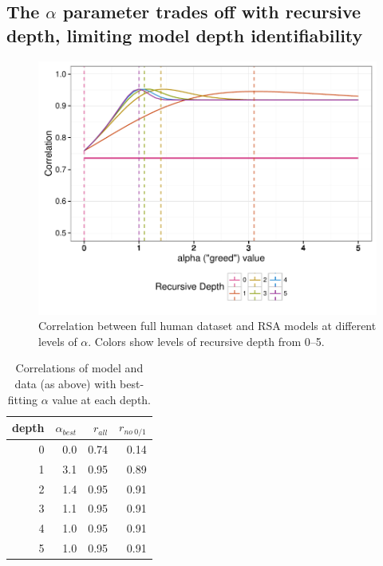 \documentclass[man,noapacite]{apa2}
\begin{document}
\subsection{The $\alpha$ parameter trades off with recursive depth, limiting model depth identifiability}

\begin{figure}[t]
 \centering
 \includegraphics[width=5in]{../plots/alpha-fit.pdf}
 \caption{\label{fig:alpha-fit} Correlation between full human dataset and RSA models at different levels of $\alpha$. Colors show levels of recursive depth from 0--5.}
\end{figure}

\begin{table}[ht]
\centering
\begin{tabular}{rrrr}
  \hline
depth & $\alpha_{best}$ & $r_{all}$ & $r_{no~0/1}$ \\
  \hline
  0 & 0.0 & 0.74 & 0.14 \\
    1 & 3.1 & 0.95 & 0.89 \\
    2 & 1.4 & 0.95 & 0.91 \\
    3 & 1.1 & 0.95 & 0.91 \\
    4 & 1.0 & 0.95 & 0.91 \\
    5 & 1.0 & 0.95 & 0.91 \\
   \hline
\end{tabular}
\caption{\label{tab:corrs-fita} Correlations of model and data (as above) with best-fitting $\alpha$ value at each depth.}
\end{table}
\end{document}
